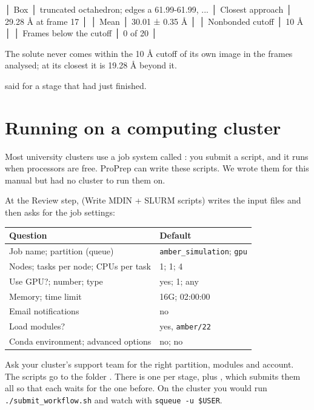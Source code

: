 \begin{screen}
│ Box                       │ truncated octahedron; edges a 61.99-61.99, ...
│ Closest approach          │ 29.28 Å at frame 17                         │
│ Mean                      │ 30.01 ± 0.35 Å                              │
│ Nonbonded cutoff          │ 10 Å                                        │
│ Frames below the cutoff   │ 0 of 20                                     │

The solute never comes within the 10 Å cutoff of its own image in the frames
analysed; at its closest it is 19.28 Å beyond it.
\end{screen}

 said  for a stage that had just finished.

\section{Running on a computing cluster}\label{sec:runningmd-cluster}

Most university clusters use a job system called : you submit a
script, and it runs when processors are free. ProPrep can write these scripts.
We wrote them for this manual but had no cluster to run them on.

At the Review step,  (Write MDIN + SLURM scripts) writes the input
files and then asks for the job settings:

\begin{tabularx}{\linewidth}{@{}lL@{}}
\toprule
\textbf{Question} & \textbf{Default} \\
\midrule
Job name; partition (queue) & \texttt{amber\_simulation}; \texttt{gpu} \\
Nodes; tasks per node; CPUs per task & 1; 1; 4 \\
Use GPU?; number; type & yes; 1; any \\
Memory; time limit & 16G; 02:00:00 \\
Email notifications & no \\
Load modules? & yes, \texttt{amber/22} \\
Conda environment; advanced options & no; no \\
\bottomrule
\end{tabularx}

\medskip
Ask your cluster's support team for the right partition, modules and
account. The scripts go to the folder .
There is one  per stage, plus ,
which submits them all so that each waits for the one before. On the cluster you would run
\texttt{./submit\_workflow.sh} and watch with \texttt{squeue -u \$USER}.

